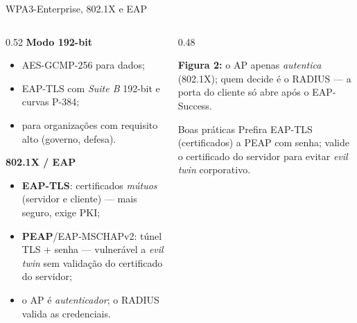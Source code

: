 \documentclass[aspectratio=169,11pt]{beamer}
\begin{document}
\begin{frame}{WPA3-Enterprise, 802.1X e EAP}
  \begin{columns}
    \begin{column}{0.52\textwidth}
      \textbf{Modo 192-bit}
      \begin{itemize}
        \item AES-GCMP-256 para dados;
        \item EAP-TLS com \emph{Suite B} 192-bit e curvas P-384;
        \item para organizações com requisito alto (governo, defesa).
      \end{itemize}
      \textbf{802.1X / EAP}
      \begin{itemize}
        \item \textbf{EAP-TLS}: certificados \emph{mútuos} (servidor e cliente) --- mais seguro, exige PKI;
        \item \textbf{PEAP}/EAP-MSCHAPv2: túnel TLS + senha --- vulnerável a \emph{evil twin} sem validação do certificado do servidor;
        \item o AP é \emph{autenticador}; o RADIUS valida as credenciais.
      \end{itemize}
    \end{column}
    \begin{column}{0.48\textwidth}
      \begin{center}
      \end{center}
      \vspace{1mm}
      {\scriptsize \textbf{Figura 2:} o AP apenas \emph{autentica} (802.1X); quem decide é o RADIUS --- a porta do cliente só abre após o EAP-Success.}
      \begin{alertblock}{Boas práticas}
        Prefira EAP-TLS (certificados) a PEAP com senha; valide o certificado do servidor para evitar \emph{evil twin} corporativo.
      \end{alertblock}
    \end{column}
  \end{columns}
\end{frame}
\end{document}
